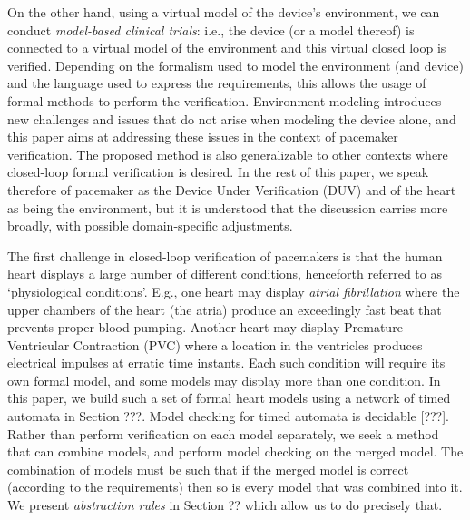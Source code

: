 On the other hand, using a virtual model of the device's environment, we can conduct \emph{model-based clinical trials}: i.e., the device (or a model thereof) is connected to a virtual model of the environment and this virtual closed loop is verified.
Depending on the formalism used to model the environment (and device) and the language used to express the requirements, this allows the usage of formal methods to perform the verification.
Environment modeling introduces new challenges and issues that do not arise when modeling the device alone, and this paper aims at addressing these issues in the context of pacemaker verification.
The proposed method is also generalizable to other contexts where closed-loop formal verification is desired.
In the rest of this paper, we speak therefore of pacemaker as the Device Under Verification (DUV) and of the heart as being the environment, but it is understood that the discussion carries more broadly, with possible domain-specific adjustments.

The first challenge in closed-loop verification of pacemakers is that the human heart displays a large number of different conditions, henceforth referred to as `physiological conditions'.
E.g., one heart may display \emph{atrial fibrillation} where the upper chambers of the heart (the atria) produce an exceedingly fast beat that prevents proper blood pumping.
Another heart may display Premature Ventricular Contraction (PVC) where a location in the ventricles produces electrical impulses at erratic time instants.
Each such condition will require its own formal model, and some models may display more than one condition.
In this paper, we build such a set of formal heart models using a network of timed automata in Section ???.
Model checking for timed automata is decidable [???].
Rather than perform verification on each model separately, we seek a method that can combine models, and perform model checking on the merged model. 
The combination of models must be such that if the merged model is correct (according to the requirements) then so is every model that was combined into it.
We present \emph{abstraction rules} in Section ?? which allow us to do precisely that.

